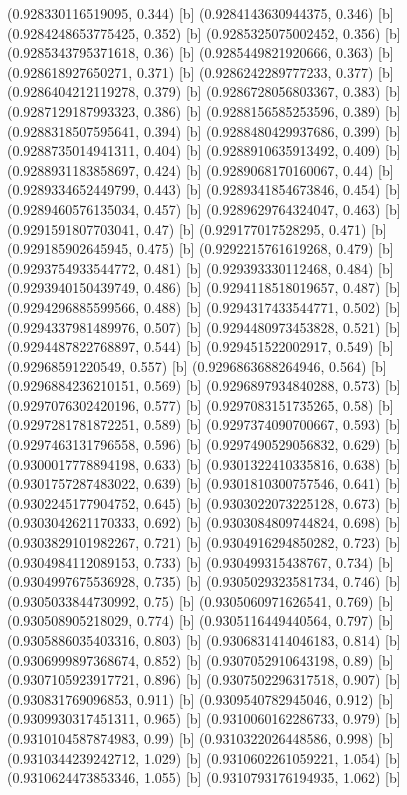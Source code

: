 {{{(0.928330116519095, 0.344) [b] 
(0.9284143630944375, 0.346) [b] 
(0.9284248653775425, 0.352) [b] 
(0.9285325075002452, 0.356) [b] 
(0.9285343795371618, 0.36) [b] 
(0.9285449821920666, 0.363) [b] 
(0.928618927650271, 0.371) [b] 
(0.9286242289777233, 0.377) [b] 
(0.9286404212119278, 0.379) [b] 
(0.9286728056803367, 0.383) [b] 
(0.9287129187993323, 0.386) [b] 
(0.9288156585253596, 0.389) [b] 
(0.9288318507595641, 0.394) [b] 
(0.9288480429937686, 0.399) [b] 
(0.9288735014941311, 0.404) [b] 
(0.9288910635913492, 0.409) [b] 
(0.9288931183858697, 0.424) [b] 
(0.9289068170160067, 0.44) [b] 
(0.9289334652449799, 0.443) [b] 
(0.9289341854673846, 0.454) [b] 
(0.9289460576135034, 0.457) [b] 
(0.9289629764324047, 0.463) [b] 
(0.9291591807703041, 0.47) [b] 
(0.929177017528295, 0.471) [b] 
(0.929185902645945, 0.475) [b] 
(0.9292215761619268, 0.479) [b] 
(0.9293754933544772, 0.481) [b] 
(0.929393330112468, 0.484) [b] 
(0.9293940150439749, 0.486) [b] 
(0.9294118518019657, 0.487) [b] 
(0.9294296885599566, 0.488) [b] 
(0.9294317433544771, 0.502) [b] 
(0.9294337981489976, 0.507) [b] 
(0.9294480973453828, 0.521) [b] 
(0.9294487822768897, 0.544) [b] 
(0.929451522002917, 0.549) [b] 
(0.92968591220549, 0.557) [b] 
(0.9296863688264946, 0.564) [b] 
(0.9296884236210151, 0.569) [b] 
(0.9296897934840288, 0.573) [b] 
(0.9297076302420196, 0.577) [b] 
(0.9297083151735265, 0.58) [b] 
(0.9297281781872251, 0.589) [b] 
(0.9297374090700667, 0.593) [b] 
(0.9297463131796558, 0.596) [b] 
(0.9297490529056832, 0.629) [b] 
(0.9300017778894198, 0.633) [b] 
(0.9301322410335816, 0.638) [b] 
(0.9301757287483022, 0.639) [b] 
(0.9301810300757546, 0.641) [b] 
(0.9302245177904752, 0.645) [b] 
(0.9303022073225128, 0.673) [b] 
(0.9303042621170333, 0.692) [b] 
(0.9303084809744824, 0.698) [b] 
(0.9303829101982267, 0.721) [b] 
(0.9304916294850282, 0.723) [b] 
(0.9304984112089153, 0.733) [b] 
(0.930499315438767, 0.734) [b] 
(0.9304997675536928, 0.735) [b] 
(0.9305029323581734, 0.746) [b] 
(0.9305033844730992, 0.75) [b] 
(0.9305060971626541, 0.769) [b] 
(0.930508905218029, 0.774) [b] 
(0.9305116449440564, 0.797) [b] 
(0.9305886035403316, 0.803) [b] 
(0.9306831414046183, 0.814) [b] 
(0.9306999897368674, 0.852) [b] 
(0.9307052910643198, 0.89) [b] 
(0.9307105923917721, 0.896) [b] 
(0.9307502296317518, 0.907) [b] 
(0.930831769096853, 0.911) [b] 
(0.9309540782945046, 0.912) [b] 
(0.9309930317451311, 0.965) [b] 
(0.9310060162286733, 0.979) [b] 
(0.9310104587874983, 0.99) [b] 
(0.9310322026448586, 0.998) [b] 
(0.9310344239242712, 1.029) [b] 
(0.9310602261059221, 1.054) [b] 
(0.9310624473853346, 1.055) [b] 
(0.9310793176194935, 1.062) [b] 
}}}
